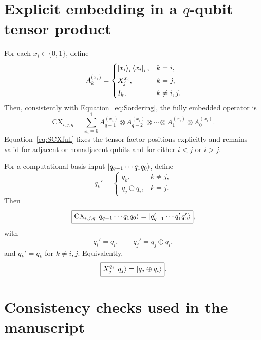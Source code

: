 \documentclass[11pt,a4paper]{article}
\newcommand{\CX}{\mathrm{CX}}
\begin{document}
\section{Explicit embedding in a $q$-qubit tensor product}

For each $x_i\in\{0,1\}$, define
\begin{equation}
A_k^{(x_i)}=
\begin{cases}
\ket{x_i}_i\bra{x_i}_i,&k=i,\\[1mm]
X_j^{x_i},&k=j,\\[1mm]
I_k,&k\neq i,j.
\end{cases}
\label{eq:SAk}
\end{equation}
Then, consistently with Equation~\eqref{eq:Sordering}, the fully embedded operator is
\begin{equation}
\boxed{
\CX_{i,j,q}
=
\sum_{x_i=0}^{1}
A_{q-1}^{(x_i)}\otimes A_{q-2}^{(x_i)}\otimes\cdots\otimes A_1^{(x_i)}\otimes A_0^{(x_i)}
}.
\label{eq:SCXfull}
\end{equation}
Equation~\eqref{eq:SCXfull} fixes the tensor-factor positions explicitly and remains valid for adjacent or nonadjacent qubits and for either $i<j$ or $i>j$.

For a computational-basis input $\ket{q_{q-1}\cdots q_1q_0}$, define
\begin{equation}
q_k'=
\begin{cases}
q_k,&k\neq j,\\[1mm]
q_j\oplus q_i,&k=j.
\end{cases}
\end{equation}
Then
\begin{equation}
\boxed{
\CX_{i,j,q}\ket{q_{q-1}\cdots q_1q_0}
=
\ket{q'_{q-1}\cdots q'_1q'_0}
},
\end{equation}
with
\begin{equation}
\boxed{q_i'=q_i,\qquad q_j'=q_j\oplus q_i},
\end{equation}
and $q_k'=q_k$ for $k\neq i,j$.  Equivalently,
\begin{equation}
\boxed{X_j^{q_i}\ket{q_j}=\ket{q_j\oplus q_i}}.
\end{equation}

\section{Consistency checks used in the manuscript}
\end{document}
